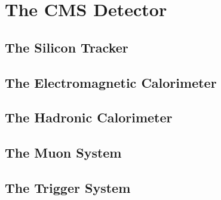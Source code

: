 \section{The CMS Detector}
\label{sec:CMSdetector}

\subsection{The Silicon Tracker}
\subsection{The Electromagnetic Calorimeter}
\subsection{The Hadronic Calorimeter}
\subsection{The Muon System}
\subsection{The Trigger System}